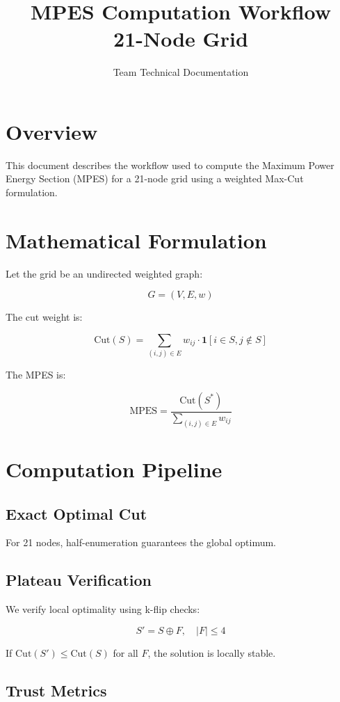 \documentclass[11pt]{article}
\title{MPES Computation Workflow \\ 21-Node Grid}
\author{Team Technical Documentation}
\date{}
\begin{document}
\maketitle

\section{Overview}

This document describes the workflow used to compute the Maximum Power Energy Section (MPES) for a 21-node grid using a weighted Max-Cut formulation.

\section{Mathematical Formulation}

Let the grid be an undirected weighted graph:

\[
G = (V, E, w)
\]

The cut weight is:

\[
\text{Cut}(S) = \sum_{(i,j)\in E} w_{ij} \cdot \mathbf{1}[i \in S, j \notin S]
\]

The MPES is:

\[
\text{MPES} = \frac{\text{Cut}(S^*)}{\sum_{(i,j)\in E} w_{ij}}
\]

\section{Computation Pipeline}

\subsection{Exact Optimal Cut}

For 21 nodes, half-enumeration guarantees the global optimum.

\subsection{Plateau Verification}

We verify local optimality using k-flip checks:

\[
S' = S \oplus F, \quad |F| \leq 4
\]

If $\text{Cut}(S') \leq \text{Cut}(S)$ for all $F$, the solution is locally stable.

\subsection{Trust Metrics}
\end{document}

